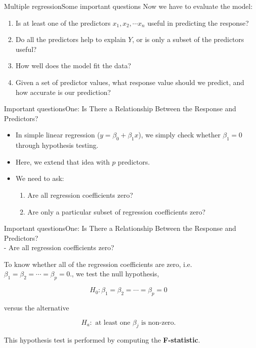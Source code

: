 \begin{frame}{Multiple regression}{Some important questions}
Now we have to evaluate the model:
\begin{enumerate}
    \item <1-> Is at least one of the predictors $x_1, x_2, \cdots x_n$ useful in predicting the response? \pause    
    \item <2-4> Do all the predictors help to explain $Y$, or is only a subset of the predictors useful? \pause
    \item <3-4> How well does the model fit the data? \pause
    \item <4>Given a set of predictor values, what response value should we predict, and how accurate is our prediction? \pause 
\end{enumerate}
\end{frame}


\begin{frame}{Important questions}{One: Is There a Relationship Between the Response and Predictors?}

\begin{itemize}
    \item In simple linear regression ($y = \beta_0 + \beta_1 x$), we simply check whether $\beta_1 = 0$ through hypothesis testing. \pause
    \item Here, we extend that idea with $p$ predictors. \pause
    \item We need to ask:
    \begin{enumerate}
        \item Are all regression coefficients zero? \pause
        \item Are only a particular subset of regression coefficients zero?
    \end{enumerate}

    \end{itemize}

\end{frame}

\begin{frame}{Important questions}{One: Is There a Relationship Between the Response and Predictors? \\ - Are all regression coefficients zero? }

To know whether all of the regression coeﬃcients are zero, i.e. $\beta_1 = \beta_2 = \cdots = \beta_p = 0.$, we test the null hypothesis, 

$$H_0: \beta_1 = \beta_2 = \cdots = \beta_p = 0 $$ 

versus the alternative \pause

$$H_a: \text{ at least one } \beta_j \text{ is non-zero}.$$

This hypothesis test is performed by computing the \textbf{F-statistic}.
    
\end{frame}


